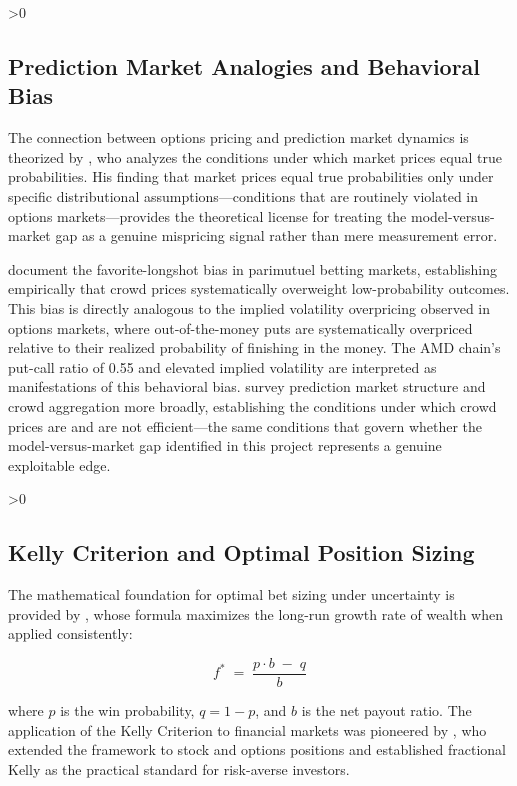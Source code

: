 \documentclass[12pt, letterpaper]{article}
\let\oldsubsection\subsection
\renewcommand{\subsection}{%
  \ifnum\value{subsection}>0 \clearpage\fi
  \oldsubsection
}
\begin{document}
\subsection{Prediction Market Analogies and Behavioral Bias}

The connection between options pricing and prediction market dynamics
is theorized by \citet{Manski2006}, who analyzes the conditions under
which market prices equal true probabilities. His finding that market
prices equal true probabilities only under specific distributional
assumptions---conditions that are routinely violated in options
markets---provides the theoretical license for treating the
model-versus-market gap as a genuine mispricing signal rather than
mere measurement error.

\citet{Thaler1988} document the favorite-longshot bias in parimutuel
betting markets, establishing empirically that crowd prices
systematically overweight low-probability outcomes. This bias is
directly analogous to the implied volatility overpricing observed in
options markets, where out-of-the-money puts are systematically
overpriced relative to their realized probability of finishing in the
money. The AMD chain's put-call ratio of 0.55 and elevated implied
volatility are interpreted as manifestations of this behavioral bias.
\citet{Wolfers2004} survey prediction market structure and crowd
aggregation more broadly, establishing the conditions under which
crowd prices are and are not efficient---the same conditions that
govern whether the model-versus-market gap identified in this project
represents a genuine exploitable edge.

\subsection{Kelly Criterion and Optimal Position Sizing}

The mathematical foundation for optimal bet sizing under uncertainty
is provided by \citet{Kelly1956}, whose formula maximizes the long-run
growth rate of wealth when applied consistently:

\begin{equation}
  f^{*} \;=\; \frac{p \cdot b \;-\; q}{b}
  \label{eq:kelly}
\end{equation}

\noindent where $p$ is the win probability, $q = 1 - p$, and $b$ is
the net payout ratio. The application of the Kelly Criterion to
financial markets was pioneered by \citet{Thorp1969}, who extended the
framework to stock and options positions and established fractional
Kelly as the practical standard for risk-averse investors.
\end{document}
